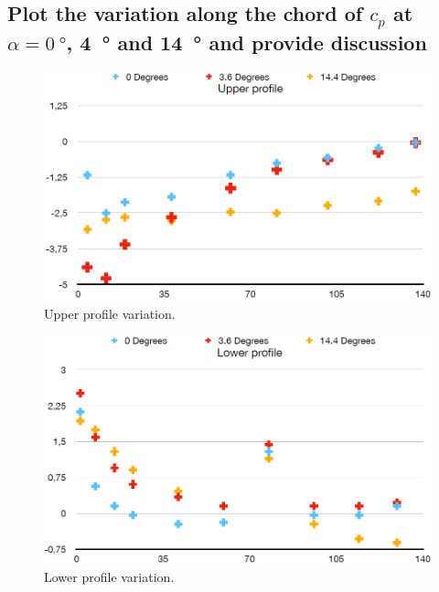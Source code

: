 \documentclass[11pt]{article}
\numberwithin{equation}{section}
\begin{document}
\subsection*{Plot the variation along the chord of $c_p$ at $\alpha = \SI{0}{\degree}$, \SI{4}{\degree} and \SI{14}{\degree} and provide discussion}
\begin{figure}[H]
  \centering
  \includegraphics[width=\textwidth]{./img/diagram10.png}
  \caption{Upper profile variation.}
\end{figure}
\begin{figure}[H]
  \centering
  \includegraphics[width=\textwidth]{./img/diagram11.png}
  \caption{Lower profile variation.}
\end{figure}
\end{document}
